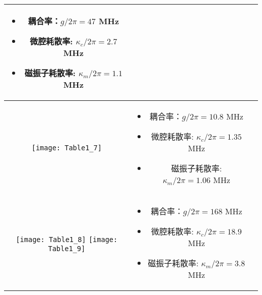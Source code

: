 \begin{center}
\begin{tabular}{ccc}
		\begin{minipage}[m]{.5\textwidth}
			\begin{itemize}
				\item 耦合率：$g/2\pi=47$ MHz
				\item 微腔耗散率: $\kappa_c /2\pi=2.7$ MHz
				\item 磁振子耗散率: $\kappa_m /2\pi=1.1$ MHz
			\end{itemize}
		\end{minipage} &
		\parencite{PhysRevLett.113.083603Nakamura} \\
		\hline
		\begin{minipage}[m]{.3\textwidth}\centering\vspace*{5pt}
			\texttt{[image: Table1\_7]}\vspace*{5pt}
		\end{minipage} &
		\begin{minipage}[m]{.5\textwidth}
			\begin{itemize}
				\item 耦合率：$g/2\pi=10.8$ MHz
				\item 微腔耗散率: $\kappa_c /2\pi=1.35$ MHz
				\item 磁振子耗散率: $\kappa_m /2\pi=1.06$ MHz
			\end{itemize}
		\end{minipage} &
		\parencite{PhysRevLett.113.156401Tang} \\
		\hline
		\begin{minipage}[m]{.3\textwidth}\centering\vspace*{5pt}
			\texttt{[image: Table1\_8]}
			\texttt{[image: Table1\_9]}\vspace*{5pt}
		\end{minipage} &
		\begin{minipage}[m]{.5\textwidth}
			\begin{itemize}
				\item 耦合率：$g/2\pi=168$ MHz
				\item 微腔耗散率: $\kappa_c /2\pi=18.9$ MHz
				\item 磁振子耗散率: $\kappa_m /2\pi=3.8$ MHz
			\end{itemize}
		\end{minipage} &
		\parencite{PhysRevLett.114.227201Hu} \\
		\bottomrule
	\end{tabular}
\end{center}
